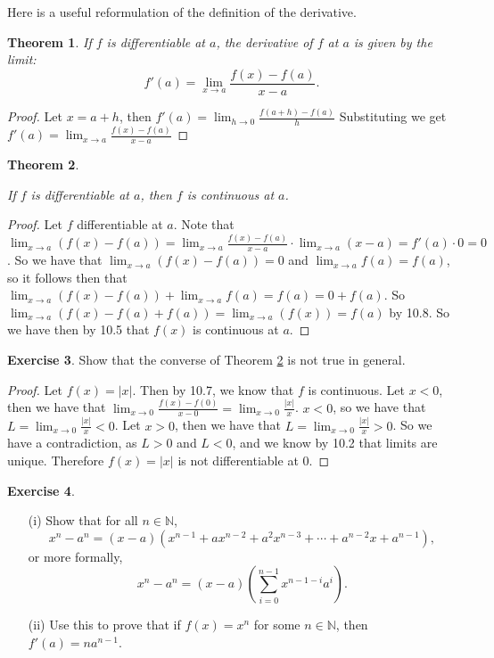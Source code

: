 \documentclass[12pt]{article}
\newcommand{\bbN}{\mathbb{N}}
\providecommand{\abs}[1]{\lvert #1 \rvert}
\providecommand{\sarr}{\rightarrow}
\renewcommand{\_}[1]{\underline{ #1 }}
\newtheorem{theorem}{Theorem}[section]
\theoremstyle{definition}
\newtheorem{exercise}[theorem]{Exercise}
\numberwithin{equation}{subsection}
\begin{document}
Here is a useful reformulation of the definition of the derivative.

\begin{theorem}  If $f$ is differentiable at $a$, the derivative of $f$ at $a$ is given by the limit:
\[
f'(a) = \lim_{x \sarr a} \frac{f(x) - f(a)}{x - a}.
\]
\end{theorem}

\begin{proof}
Let $x = a + h$, then $f'(a) = \lim_{h \to 0}\frac{f(a+h) - f(a)}{h}$ \newline
Substituting we get $f'(a) = \lim_{x \to a}\frac{f(x)-f(a)}{x-a}$ 
\end{proof}

\begin{theorem}\label{diffconta} 

 If $f$ is differentiable at $a$, then $f$ is continuous at $a$.
\end{theorem}

\begin{proof}
Let $f$ differentiable at $a$. Note that $\lim_{x \to a}(f(x) - f(a)) = \lim_{x \to a}\frac{f(x) - f(a)}{x - a} \cdot \lim_{x \to a}(x-a) = f'(a) \cdot 0 = 0$. So we have that $\lim_{x \to a}(f(x) - f(a)) = 0$ and $\lim_{x \to a}f(a) = f(a)$, so it follows then that $\lim_{x \to a}(f(x) - f(a)) + \lim_{x \to a}f(a) = f(a) = 0 + f(a)$. So $\lim_{x \to a}(f(x)-f(a)+f(a)) = \lim_{x \to a}(f(x)) = f(a)$ by 10.8. So we have then by 10.5 that $f(x)$ is continuous at $a$.
\end{proof}

\begin{exercise}

Show that the converse of Theorem \ref{diffconta} is not true in general.
\end{exercise}

\begin{proof}
Let $f(x) = \abs{x}$. Then by 10.7, we know that $f$ is continuous. Let $x < 0$, then we have that $\lim_{x \to 0}\frac{f(x)-f(0)}{x-0} = \lim_{x \to 0}\frac{\abs{x}}{x}$. $x < 0$, so we have that $L = \lim_{x \to 0}\frac{\abs{x}}{x} < 0$. Let $x > 0$, then we have that $L = \lim_{x \to 0}\frac{\abs{x}}{x} > 0$. So we have a contradiction, as $L > 0$ and $L < 0$, and we know by 10.2 that limits are unique. Therefore $f(x) = \abs{x}$ is not differentiable at $0$.
\end{proof}

\begin{exercise}
\begin{itemize}
\item[(i)]
Show that for all $n\in\bbN$, 
$$x^n-a^n=(x-a)(x^{n-1}+ax^{n-2}+a^2x^{n-3}+\cdots+a^{n-2}x+a^{n-1}),$$
or more formally,
$$x^n-a^n=(x-a)\left(\sum_{i=0}^{n-1} x^{n-1-i} a^i\right).$$

\item[(ii)]
Use this to prove that if $f(x)=x^n$ for some $n\in \bbN$, then $f'(a)=na^{n-1}$.
\end{itemize}
\end{exercise}
\end{document}
